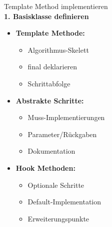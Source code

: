 \begin{KR}{Template Method implementieren}\\
\textbf{1. Basisklasse definieren}
\begin{itemize}
    \item \textbf{Template Methode:}
    \begin{itemize}
        \item Algorithmus-Skelett
        \item final deklarieren
        \item Schrittabfolge
    \end{itemize}
    
    \item \textbf{Abstrakte Schritte:}
    \begin{itemize}
        \item Muss-Implementierungen
        \item Parameter/Rückgaben
        \item Dokumentation
    \end{itemize}
    
    \item \textbf{Hook Methoden:}
    \begin{itemize}
        \item Optionale Schritte
        \item Default-Implementation
        \item Erweiterungspunkte
    \end{itemize}
\end{itemize}
\end{KR}

